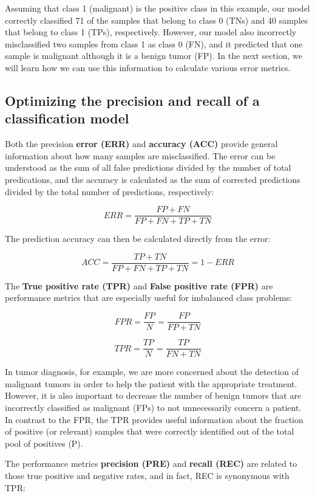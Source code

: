 \documentclass[11pt]{article}
\begin{document}
    Assuming that class 1 (malignant) is the positive class in this example,
our model correctly classified 71 of the samples that belong to class 0
(TNs) and 40 samples that belong to class 1 (TPs), respectively.
However, our model also incorrectly misclassified two samples from class
1 as class 0 (FN), and it predicted that one sample is malignant
although it is a benign tumor (FP). In the next section, we will learn
how we can use this information to calculate various error metrics.

    \subsection{Optimizing the precision and recall of a classification
model}\label{optimizing-the-precision-and-recall-of-a-classification-model}

    Both the precision \textbf{error (ERR)} and \textbf{accuracy (ACC)}
provide general information about how many samples are misclassified.
The error can be understood as the sum of all false predictions divided
by the number of total predications, and the accuracy is calculated as
the sum of corrected predictions divided by the total number of
predictions, respectively:

\[ERR = \frac{FP + FN}{FP + FN + TP + TN}\]

The prediction accuracy can then be calculated directly from the error:

\[ACC = \frac{TP + TN}{FP + FN + TP + TN} = 1 - ERR\]

The \textbf{True positive rate (TPR)} and \textbf{False positive rate
(FPR)} are performance metrics that are especially useful for imbalanced
class problems:

\[FPR = \frac{FP}{N} = \frac{FP}{FP+TN}\]

\[TPR = \frac{TP}{N} = \frac{TP}{FN+TN}\]

In tumor diagnosis, for example, we are more concerned about the
detection of malignant tumors in order to help the patient with the
appropriate treatment. However, it is also important to decrease the
number of benign tumors that are incorrectly classified as malignant
(FPs) to not unnecessarily concern a patient. In contrast to the FPR,
the TPR provides useful information about the fraction of positive (or
relevant) samples that were correctly identified out of the total pool
of positives (P).

The performance metrics \textbf{precision (PRE)} and \textbf{recall
(REC)} are related to those true positive and negative rates, and in
fact, REC is synonymous with TPR:
\end{document}

